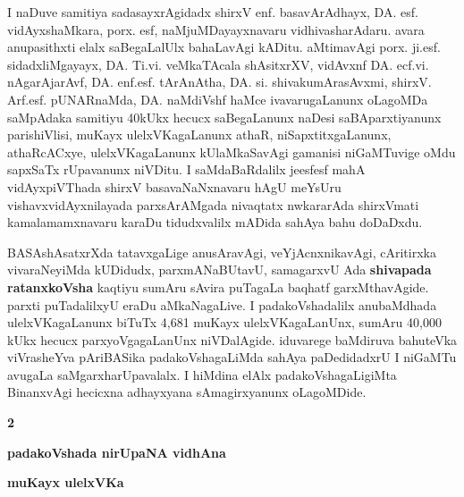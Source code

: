 \medskip

I naDuve samitiya sadasayxrAgidadx shirxV enf. basavArAdhayx, DA. esf. vidAyxshaMkara, porx. esf, naMjuMDayayxnavaru vidhivasharAdaru. avara anupa\-sithxti elalx saBegaLalUlx bahaLavAgi kADitu. aMtimavAgi porx. ji.esf. sidadxliMgayayx, DA. Ti.vi. veMkaTAcala shAsitxrXV, vidAvxnf DA. ecf.vi. nAgarAjarAvf, DA. enf.esf. tArAnAtha, DA. si. shivakumArasAvxmi, shirxV. Arf.esf. pUNARnaMda, DA. naMdiVshf haMce ivavaru\-gaLanunx oLagoMDa saMpAdaka samitiyu 40kUkx hecucx saBegaLanunx naDesi saBA\-parxtiyanunx parishiVlisi, muKayx ulelxVKagaLanunx athaR, niSapxtitxgaLanunx, athaRcACxye, ulelxVKagaLanunx kUlaMkaSavAgi gamanisi niGaMTu\-vige oMdu sapxSaTx rUpavanunx niVDitu. I saMdaBaRdalilx je{esf}{esf} mahA vidAyxpiVThada shirxV basavaNaNxnavaru hAgU meYsUru vishavxvidAyxnilayada parxsArAMgada nivaqtatx nwkararAda shirxVmati kamalamamxnavaru karaDu tidudxvalilx mADida sahAya bahu doDaDxdu.

\medskip

BASAshAsatxrXda tatavxgaLige anusAravAgi, veYjAcnxnikavAgi, cAritirxka vivaraNeyiMda kUDidudx, parxmANaBUtavU, samagarxvU Ada \textbf{shivapada ratanxkoVsha} kaqtiyu sumAru sAvira puTagaLa baqhatf garxMthavAgide. parxti puTadalilxyU eraDu aMkaNagaLive. I padakoVshadalilx anubaMdhada ulelxVKagaLanunx biTuTx 4,681 muKayx ulelxVKagaLanUnx, sumAru 40,000 kUkx hecucx parxyoVga\-gaLanUnx niVDalAgide. iduvarege baMdiruva bahuteVka viVrasheYva pAriBASika padakoVshagaLiMda sahAya paDedidadxrU I niGaMTu avugaLa saMgarxharUpa\-valalx. I hiMdina elAlx padakoVshagaLigiMta BinanxvAgi hecicxna adhayxyana sAmagirxyanunx oLagoMDide. 

\newpage

\begin{center}
{\large\bfseries 2}
\bigskip

{\Large\bf padakoVshada nirUpaNA vidhAna}

\bigskip

{\large\bf muKayx ulelxVKa}
\end{center}

